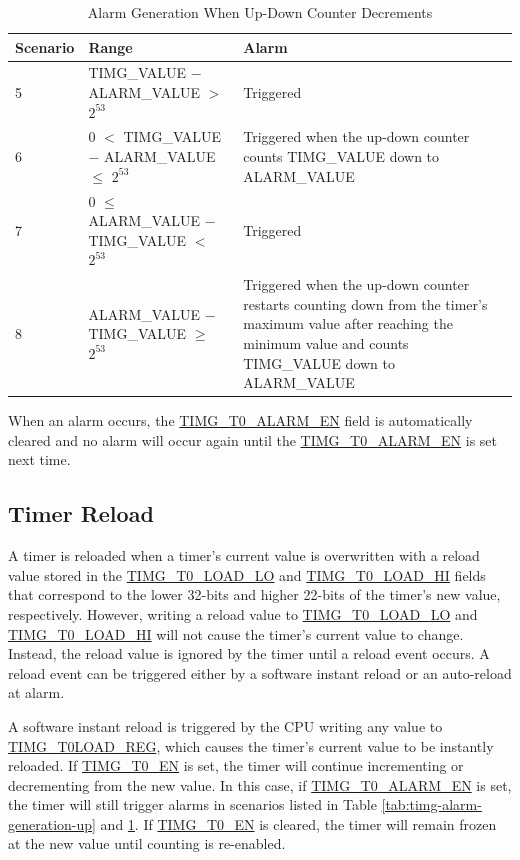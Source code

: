 \documentclass[main\_\_EN.tex]{subfiles}
\begin{document}
\begin{table}[H]
\centering
\caption{Alarm Generation When Up-Down Counter Decrements}
\label{tab:timg-alarm-generation-down}

\begin{tabular}{|l|l|m{7cm}|}
\hline
\rowcolor{lightgray}
    \textbf{Scenario} & \textbf{Range} & \textbf{Alarm} \\\hline
     5 & TIMG\_VALUE $-$ ALARM\_VALUE  $>$ $2^{53}$ & Triggered \\\hline
     6 &  0 $<$ TIMG\_VALUE $-$ ALARM\_VALUE $\leq$ $2^{53}$ & Triggered when the up-down counter counts TIMG\_VALUE down to ALARM\_VALUE \\\hline
     7 & 0 $\leq$ ALARM\_VALUE $-$ TIMG\_VALUE $<$ $2^{53}$ & Triggered \\\hline
     8 & ALARM\_VALUE $-$ TIMG\_VALUE $\geq$ $2^{53}$ & Triggered when the up-down counter restarts counting down from the timer's maximum value after reaching the minimum value and counts TIMG\_VALUE down to ALARM\_VALUE \\\hline
\end{tabular}
\end{table}

When an alarm occurs, the \hyperref[fielddesc:TIMGTXALARMEN]{TIMG\_T0\_ALARM\_EN} field is automatically cleared and no alarm will occur again until the \hyperref[fielddesc:TIMGTXALARMEN]{TIMG\_T0\_ALARM\_EN} is set next time.

\subsection{Timer Reload}
\label{sec:timg-func-descr-reload}

A timer is reloaded when a timer's current value is overwritten with a reload value stored in the \hyperref[fielddesc:TIMGTXLOADLO]{TIMG\_T0\_LOAD\_LO} and \hyperref[fielddesc:TIMGTXLOADHI]{TIMG\_T0\_LOAD\_HI} fields that correspond to the lower 32-bits and higher 22-bits of the timer's new value, respectively. However, writing a reload value to \hyperref[fielddesc:TIMGTXLOADLO]{TIMG\_T0\_LOAD\_LO} and \hyperref[fielddesc:TIMGTXLOADHI]{TIMG\_T0\_LOAD\_HI} will not cause the timer's current value to change. Instead, the reload value is ignored by the timer until a reload event occurs. A reload event can be triggered either by a software instant reload or an auto-reload at alarm.

A software instant reload is triggered by the CPU writing any value to \hyperref[regdesc:TIMGTXLOADREG]{TIMG\_T0LOAD\_REG}, which causes the timer's current value to be instantly reloaded. If \hyperref[fielddesc:TIMGTXEN]{TIMG\_T0\_EN} is set, the timer will continue incrementing or decrementing from the new value. In this case, if \hyperref[fielddesc:TIMGTXALARMEN]{TIMG\_T0\_ALARM\_EN} is set, the timer will still trigger alarms in scenarios listed in Table \ref{tab:timg-alarm-generation-up} and \ref{tab:timg-alarm-generation-down}. If \hyperref[fielddesc:TIMGTXEN]{TIMG\_T0\_EN} is cleared, the timer will remain frozen at the new value until counting is re-enabled.
\end{document}
